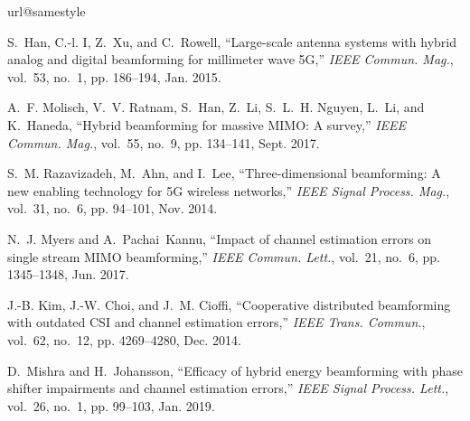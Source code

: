 \documentclass{IEEEtran}
\begin{document}


\begin{thebibliography}{10}
\providecommand{\url}[1]{#1}
\csname url@samestyle\endcsname
\providecommand{\newblock}{\relax}
\providecommand{\bibinfo}[2]{#2}
\providecommand{\BIBentrySTDinterwordspacing}{\spaceskip=0pt\relax}
\providecommand{\BIBentryALTinterwordstretchfactor}{4}
\providecommand{\BIBentryALTinterwordspacing}{\spaceskip=\fontdimen2\font plus
\BIBentryALTinterwordstretchfactor\fontdimen3\font minus
  \fontdimen4\font\relax}
\providecommand{\BIBforeignlanguage}[2]{{%
\expandafter\ifx\csname l@#1\endcsname\relax
\typeout{** WARNING: IEEEtran.bst: No hyphenation pattern has been}%
\typeout{** loaded for the language `#1'. Using the pattern for}%
\typeout{** the default language instead.}%
\else
\language=\csname l@#1\endcsname
\fi
#2}}
\providecommand{\BIBdecl}{\relax}
\BIBdecl

S.~Han, C.-l. I, Z.~Xu, and C.~Rowell, ``Large-scale antenna systems with
  hybrid analog and digital beamforming for millimeter wave 5{G},'' \emph{IEEE
  Commun. Mag.}, vol.~53, no.~1, pp. 186--194, Jan. 2015.

A.~F. Molisch, V.~V. Ratnam, S.~Han, Z.~Li, S.~L.~H. Nguyen, L.~Li, and
  K.~Haneda, ``Hybrid beamforming for massive {MIMO}: {A} survey,'' \emph{IEEE
  Commun. Mag.}, vol.~55, no.~9, pp. 134--141, Sept. 2017.

S.~M. Razavizadeh, M.~Ahn, and I.~Lee, ``Three-dimensional beamforming: A new
  enabling technology for 5{G} wireless networks,'' \emph{IEEE Signal Process.
  Mag.}, vol.~31, no.~6, pp. 94--101, Nov. 2014.

N.~J. Myers and A.~Pachai~Kannu, ``Impact of channel estimation errors on
  single stream {MIMO} beamforming,'' \emph{IEEE Commun. Lett.}, vol.~21,
  no.~6, pp. 1345--1348, Jun. 2017.

J.-B. Kim, J.-W. Choi, and J.~M. Cioffi, ``Cooperative distributed beamforming
  with outdated {CSI} and channel estimation errors,'' \emph{IEEE Trans.
  Commun.}, vol.~62, no.~12, pp. 4269--4280, Dec. 2014.

D.~Mishra and H.~Johansson, ``Efficacy of hybrid energy beamforming with phase
  shifter impairments and channel estimation errors,'' \emph{IEEE Signal
  Process. Lett.}, vol.~26, no.~1, pp. 99--103, Jan. 2019.


\end{thebibliography}
\end{document}
